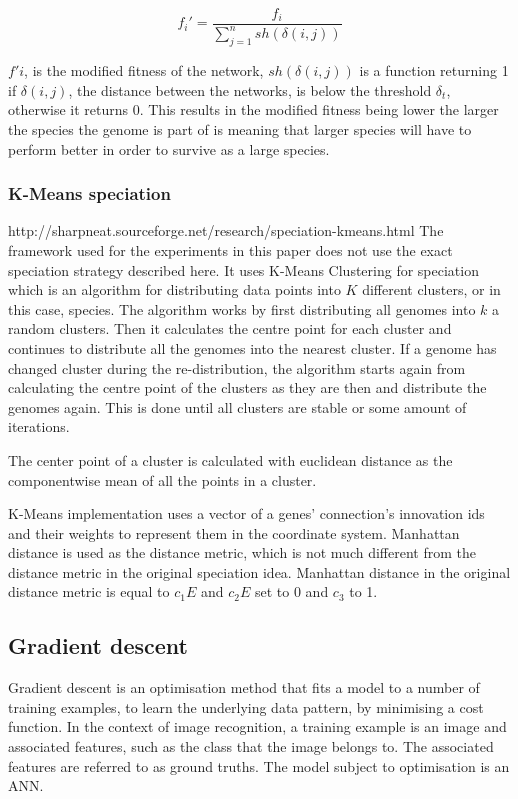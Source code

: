 $$f_i' = \frac{f_i}{\sum^n_{j=1} sh(\delta(i,j))}$$

$f'i$, is the modified fitness of the network, $sh(\delta(i,j))$ is a function returning 1 if $\delta(i,j)$, the distance between the networks, is below the threshold $\delta_t$, otherwise it returns 0. This results in the modified fitness being lower the larger the species the genome is part of is meaning that larger species will have to perform better in order to survive as a large species.

\subsubsection{K-Means speciation} 
http://sharpneat.sourceforge.net/research/speciation-kmeans.html
The framework used for the experiments in this paper does not use the exact speciation strategy described here. It uses K-Means Clustering for speciation which is an algorithm for distributing data points into $K$ different clusters, or in this case, species. The algorithm works by first distributing all genomes into $k$ a random clusters. Then it calculates the centre point for each cluster and continues to distribute all the genomes into the nearest cluster. If a genome has changed cluster during the re-distribution, the algorithm starts again from calculating the centre point of the clusters as they are then and distribute the genomes again. This is done until all clusters are stable or some amount of iterations.

The center point of a cluster is calculated with euclidean distance as the componentwise mean of all the points in a cluster.

K-Means implementation uses a vector of a genes' connection's innovation ids and their weights to represent them in the coordinate system. Manhattan distance is used as the distance metric, which is not much different from the distance metric in the original speciation idea. Manhattan distance in the original distance metric is equal to ${c_1E}$ and ${c_2E}$ set to 0 and $c_3$ to 1.

\subsection{Gradient descent}
Gradient descent is an optimisation method that fits a model to a number of training examples, to learn the underlying data pattern, by minimising a cost function. In the context of image recognition, a training example is an image and associated features, such as the class that the image belongs to. The associated features are referred to as ground truths. The model subject to optimisation is an ANN.

